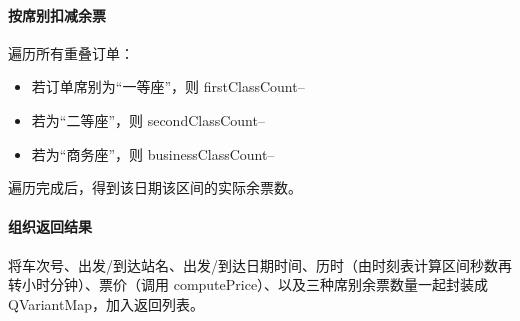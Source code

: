 \documentclass{article}
\begin{document}
	\paragraph{按席别扣减余票} 遍历所有重叠订单：
	\begin{itemize}
		\item 若订单席别为“一等座”，则 firstClassCount--
		\item 若为“二等座”，则 secondClassCount--
		\item 若为“商务座”，则 businessClassCount--
	\end{itemize}
	遍历完成后，得到该日期该区间的实际余票数。
	
	\paragraph{组织返回结果} 将车次号、出发/到达站名、出发/到达日期时间、历时（由时刻表计算区间秒数再转小时分钟）、票价（调用 computePrice）、以及三种席别余票数量一起封装成 QVariantMap，加入返回列表。
	\newline
	
\end{document}
